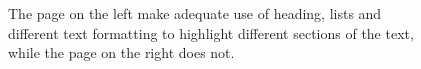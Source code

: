 \begin{itemize}
    \begin{figure}[!ht]
        \centering
        \qquad
        \caption{The page on the left make adequate use of heading, lists and different text formatting to highlight different sections of the text, while the page on the right does not.}%
        \label{fig:MC1-3}%
    \end{figure}



\end{itemize}
